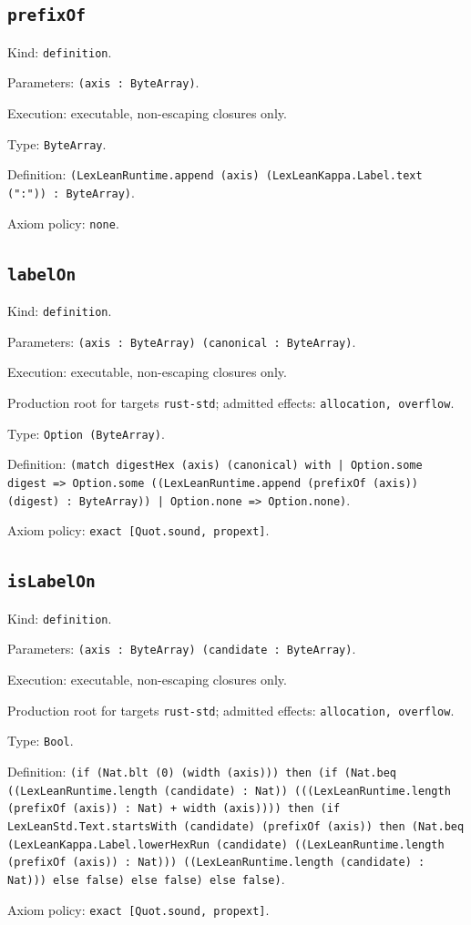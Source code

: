 \documentclass[11pt]{article}
\begin{document}
\subsection*{\texttt{prefixOf}}
\noindent Kind: \texttt{definition}.\par
\noindent Parameters: \texttt{(axis : ByteArray)}.\par
\noindent Execution: executable, non-escaping closures only.\par
\noindent Type: \texttt{ByteArray}.\par
\noindent Definition: \texttt{(LexLeanRuntime.append (axis) (LexLeanKappa.Label.text (":")) : ByteArray)}.\par
\noindent Axiom policy: \texttt{none}.\par
\subsection*{\texttt{labelOn}}
\noindent Kind: \texttt{definition}.\par
\noindent Parameters: \texttt{(axis : ByteArray) (canonical : ByteArray)}.\par
\noindent Execution: executable, non-escaping closures only.\par
\noindent Production root for targets \texttt{rust-std}; admitted effects: \texttt{allocation, overflow}.\par
\noindent Type: \texttt{Option (ByteArray)}.\par
\noindent Definition: \texttt{(match digestHex (axis) (canonical) with | Option.some digest => Option.some ((LexLeanRuntime.append (prefixOf (axis)) (digest) : ByteArray)) | Option.none => Option.none)}.\par
\noindent Axiom policy: \texttt{exact [Quot.sound, propext]}.\par
\subsection*{\texttt{isLabelOn}}
\noindent Kind: \texttt{definition}.\par
\noindent Parameters: \texttt{(axis : ByteArray) (candidate : ByteArray)}.\par
\noindent Execution: executable, non-escaping closures only.\par
\noindent Production root for targets \texttt{rust-std}; admitted effects: \texttt{allocation, overflow}.\par
\noindent Type: \texttt{Bool}.\par
\noindent Definition: \texttt{(if (Nat.blt (0) (width (axis))) then (if (Nat.beq ((LexLeanRuntime.length (candidate) : Nat)) (((LexLeanRuntime.length (prefixOf (axis)) : Nat) + width (axis)))) then (if LexLeanStd.Text.startsWith (candidate) (prefixOf (axis)) then (Nat.beq (LexLeanKappa.Label.lowerHexRun (candidate) ((LexLeanRuntime.length (prefixOf (axis)) : Nat))) ((LexLeanRuntime.length (candidate) : Nat))) else false) else false) else false)}.\par
\noindent Axiom policy: \texttt{exact [Quot.sound, propext]}.\par
\end{document}
